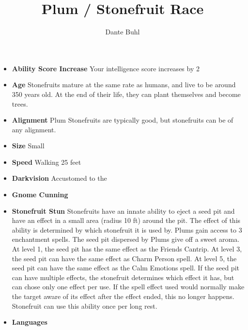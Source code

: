 \documentclass{article}
\title{Plum / Stonefruit Race}
\author{Dante Buhl}
\begin{document}
\newcommand{\bs}[1]{\boldsymbol{#1}}
\newcommand{\bmp}[1]{\begin{minipage}{#1\textwidth}}
\newcommand{\emp}{\end{minipage}}
\newcommand{\R}{\mathbb{R}}
\newcommand{\C}{\mathbb{C}}
\newcommand{\N}{\mathcal{N}}
\newcommand{\I}{\mathrm{I}}
\newcommand{\K}{\bs{\mathrm{K}}}
\newcommand{\m}{\bs{\mu}_*}
\newcommand{\s}{\bs{\Sigma}_*}
\newcommand{\dt}{\Delta t}
\newcommand{\tr}[1]{\text{Tr}(#1)}
\newcommand{\Tr}[1]{\text{Tr}(#1)}

\maketitle



\begin{itemize}

    \item \textbf{Ability Score Increase} Your intelligence score increases by 2
    
    \item \textbf{Age} Stonefruits mature at the same rate as humans, and live to be around 350 years old. At the end of their life, they can plant themselves and become trees. 
 
    \item \textbf{Alignment} Plum Stonefruits are typically good, but stonefruits can be of any alignment. 

    \item \textbf{Size} Small
 
    \item \textbf{Speed} Walking 25 feet
 
    \item \textbf{Darkvision} Accustomed to the 

    \item \textbf{Gnome Cunning}

    \item \textbf{Stonefruit Stun} Stonefruits have an innate ability to eject a seed pit and have an effect in a small area (radius 10 ft)  around the pit. The effect of this ability is determined by which stonefruit it is used by. Plums gain access to 3 enchantment spells. The seed pit dispersed by Plums give off a sweet aroma. At level 1, the seed pit has the same effect as the Friends Cantrip. At level 3, the seed pit can have the same effect as Charm Person spell. At level 5, the seed pit can have the same effect as the Calm Emotions spell. If the seed pit can have multiple effects, the stonefruit determines which effect it has, but can chose only one effect per use. If the spell effect used would normally make the target aware of its effect after the effect ended, this no longer happens. Stonefruit can use this ability once per long rest.
    
    \item \textbf{Languages} 
    
\end{itemize}
\end{document}

